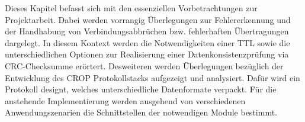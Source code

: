 \label{cap:konzept}

Dieses Kapitel befasst sich mit den essenziellen Vorbetrachtungen zur
Projektarbeit. Dabei werden vorrangig {\"U}berlegungen zur Fehlererkennung
und der Handhabung von Verbindungsabbr{\"u}chen bzw. fehlerhaften
{\"U}bertragungen dargelegt. In diesem Kontext werden die Notwendigkeiten einer
TTL sowie die unterschiedlichen Optionen zur Realisierung einer
Datenkonsistenzpr{\"u}fung via CRC-Checksumme er{\"o}rtert. Desweiteren werden
{\"U}berlegungen bez{\"u}glich der Entwicklung des CROP Protokollstacks aufgezeigt und
analysiert. Dafür wird ein Protokoll designt, welches unterschiedliche
Datenformate  verpackt. Für die
anstehende Implementierung werden ausgehend von verschiedenen Anwendungszenarien
die Schnittstellen der notwendigen Module bestimmt.